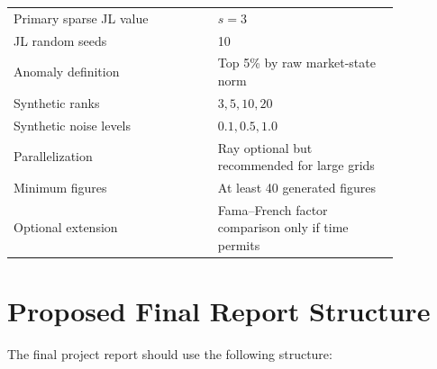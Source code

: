 \documentclass[11pt]{article}
\begin{document}
\begin{table}[H]
\begin{tabular}{p{0.45\linewidth} p{0.40\linewidth}}
Primary sparse JL value & $s=3$ \\
JL random seeds & 10 \\
Anomaly definition & Top 5\% by raw market-state norm \\
Synthetic ranks & $3,5,10,20$ \\
Synthetic noise levels & $0.1,0.5,1.0$ \\
Parallelization & Ray optional but recommended for large grids \\
Minimum figures & At least 40 generated figures \\
Optional extension & Fama--French factor comparison only if time permits \\
\bottomrule
\end{tabular}
\end{table}

\section{Proposed Final Report Structure}

The final project report should use the following structure:
\end{document}
